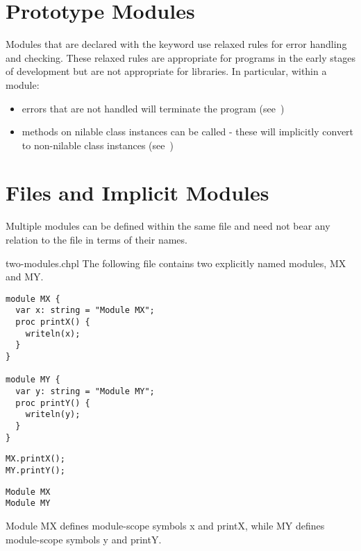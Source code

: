\section{Prototype Modules}
\label{Prototype_Modules}

Modules that are declared with the  keyword use relaxed
rules for error handling and  checking. These relaxed rules are
appropriate for programs in the early stages of development but are not
appropriate for libraries. In particular, within a  module:

\begin{itemize}

  \item errors that are not handled will terminate the program
        (see~)

  \item methods on nilable class instances can be called - these will
        implicitly convert to non-nilable class instances
        (see~)

\end{itemize}

\section{Files and Implicit Modules}
\label{Implicit_Modules}

Multiple modules can be defined within the same file and need not bear any
relation to the file in terms of their names.

\begin{chapelexample}{two-modules.chpl}
The following file contains two explicitly named modules, MX and MY.
\begin{chapel}
\begin{verbatim}
module MX {
  var x: string = "Module MX";
  proc printX() {
    writeln(x);
  }
}

module MY {
  var y: string = "Module MY";
  proc printY() {
    writeln(y);
  }
}
\end{verbatim}
\end{chapel}
\begin{chapelpost}
\begin{verbatim}
MX.printX();
MY.printY();
\end{verbatim}
\end{chapelpost}
\begin{chapeloutput}
\begin{verbatim}
Module MX
Module MY
\end{verbatim}
\end{chapeloutput}
Module MX defines module-scope symbols x and printX, while MY
defines module-scope symbols y and printY.
\end{chapelexample}

